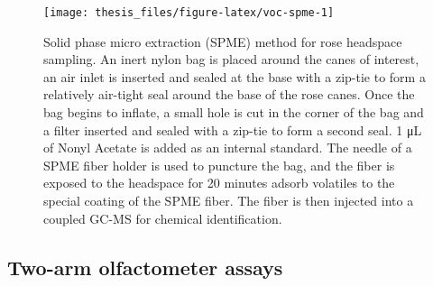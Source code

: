 \documentclass[12pt,final,CPage]{ufthesis}
\begin{document}
{\begin{figure}
  {\centering \texttt{[image: thesis\_files/figure-latex/voc-spme-1]} 

  }

  \caption[Solid phase micro extraction (SPME) method for rose headspace sampling]{Solid phase micro extraction (SPME) method for rose headspace sampling. An inert nylon bag is placed around the canes of interest, an air inlet is inserted and sealed at the base with a zip-tie to form a relatively air-tight seal around the base of the rose canes. Once the bag begins to inflate, a small hole is cut in the corner of the bag and a filter inserted and sealed with a zip-tie to form a second seal. 1 \si{\micro\liter} of Nonyl Acetate is added as an internal standard. The needle of a SPME fiber holder is used to puncture the bag, and the fiber is exposed to the headspace for 20 minutes adsorb volatiles to the special coating of the SPME fiber. The fiber is then injected into a coupled GC-MS for chemical identification.}\label{fig:voc-spme}
  \end{figure}
  \hypertarget{mm-olfact}{%
  \subsection{Two-arm olfactometer assays}\label{mm-olfact}}

}
\end{document}
